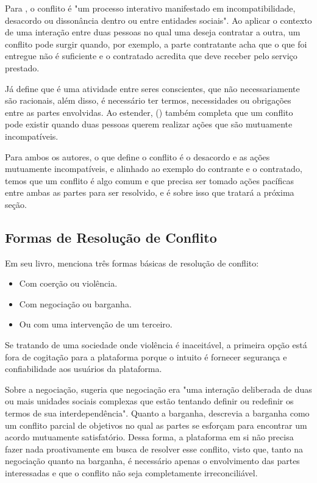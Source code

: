 Para \cite[p.18]{rahim2017managing}, o conflito é "um processo interativo manifestado em incompatibilidade, desacordo ou dissonância dentro ou entre entidades sociais". Ao aplicar o contexto de uma interação entre duas pessoas no qual uma deseja contratar a outra, um conflito pode surgir quando, por exemplo, a parte contratante acha que o que foi entregue não é suficiente e o contratado acredita que deve receber pelo serviço prestado.

Já \cite{nicholson1992rationality} define que é uma atividade entre seres conscientes, que não necessariamente são racionais, além disso, é necessário ter termos, necessidades ou obrigações entre as partes envolvidas. Ao estender, (\citeauthor{nicholson1992rationality}) também completa que um conflito pode existir quando duas pessoas querem realizar ações que são mutuamente incompatíveis.

Para ambos os autores, o que define o conflito é o desacordo e as ações mutuamente incompatíveis, e alinhado ao exemplo do contrante e o contratado, temos que um conflito é algo comum e que precisa ser tomado ações pacíficas entre ambas as partes para ser resolvido, e é sobre isso que tratará a próxima seção.

\subsection{Formas de Resolução de Conflito}

Em seu livro, \cite{bercovitch2019social} menciona três formas básicas de resolução de conflito:

\begin{itemize}
\item Com coerção ou violência.
\item Com negociação ou barganha.
\item Ou com uma intervenção de um terceiro.
\end{itemize}

Se tratando de uma sociedade onde violência é inaceitável, a primeira opção está fora de cogitação para a plataforma porque o intuito é fornecer segurança e confiabilidade aos usuários da plataforma.

Sobre a negociação, \cite[p.3]{behavioral_theory_of_labor_negotations} sugeria que negociação era "uma interação deliberada de duas ou mais unidades sociais complexas que estão tentando definir ou redefinir os termos de sua interdependência". Quanto a barganha, \cite{nicholson1992rationality} descrevia a barganha como um conflito parcial de objetivos no qual as partes se esforçam para encontrar um acordo mutuamente satisfatório. Dessa forma, a plataforma em si não precisa fazer nada proativamente em busca de resolver esse conflito, visto que, tanto na negociação quanto na barganha, é necessário apenas o envolvimento das partes interessadas e que o conflito não seja completamente irreconciliável.

